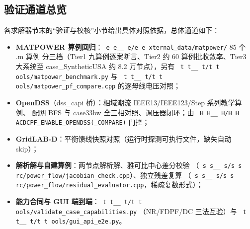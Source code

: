 \documentclass[UTF8,fontset=windows,a4paper,11pt]{ctexart}
\makeatletter
\newcommand{\srcpath}[1]{\texttt{\src@scan#1\src@stop}}
\def\src@scan#1{%
  \ifx#1\src@stop
  \else
    \ifx#1\_\_\allowbreak\else
    \ifx#1/#1\allowbreak\else
    #1\fi\fi
    \expandafter\src@scan
  \fi}
\makeatother
\begin{document}
\subsection{验证通道总览}
各求解器节末的“验证与校核”小节给出具体对照依据，总体通道如下：
\begin{itemize}
  \item \textbf{MATPOWER 算例回归}：\srcpath{external\_data/matpower/} 85 个 .m 算例
        分三档（Tier1 九算例逐案断言、Tier2 约 60 算例批收敛率、Tier3 大系统至
        case\_SyntheticUSA 约 8.2 万节点），另有 \srcpath{tools/matpower\_benchmark.py}
        与 \srcpath{tools/matpower\_pf\_compare.cpp} 的逐母线电压对照；
  \item \textbf{OpenDSS}（dss\_capi 桥）：相域潮流 IEEE13/IEEE123/Step 系列教学算例、
        配网 BFS 与 case33bw 全三相对照、调压器闭环；由
        \srcpath{HACDCPF\_ENABLE\_OPENDSS(\_COMPARE)} 门控；
  \item \textbf{GridLAB-D}：平衡馈线快照对照（运行时探测可执行文件，缺失自动 skip）；
  \item \textbf{解析解与自建算例}：两节点解析解、雅可比中心差分校验
        （\srcpath{src/power\_flow/jacobian\_check.cpp}）、独立残差复算
        （\srcpath{src/power\_flow/residual\_evaluator.cpp}，稀疏复数形式）；
  \item \textbf{能力合同与 GUI 端到端}：\srcpath{tools/validate\_case\_capabilities.py}
        （NR/FDPF/DC 三法互验）与 \srcpath{tools/gui\_api\_e2e.py}。
\end{itemize}
\end{document}

